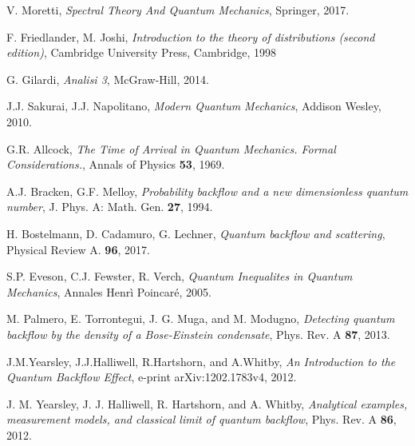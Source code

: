 \documentclass[11pt,a4paper,twoside,openany]{book}
\begin{document}
    \pagestyle{fancy}
    \fancyhf{}
    \fancyfoot[LE,RO]{\thepage}
    
    
    
    \pagestyle{fancy}
    \fancyhf{}
    \fancyfoot[LE,RO]{\thepage}
    
\begin{thebibliography}{50}
	V. Moretti, 
	\textit{Spectral Theory And Quantum Mechanics},
	Springer,
	2017.
	
	F. Friedlander, M. Joshi, 
	\textit{ Introduction to the theory of distributions (second
		edition)}, Cambridge University Press, Cambridge, 1998	
	
	G. Gilardi,
	\textit{Analisi 3},
	McGraw-Hill,
	2014.
	
	J.J. Sakurai, J.J. Napolitano,
	\textit{Modern Quantum Mechanics},
	Addison Wesley,
	2010.
	
    G.R. Allcock, 
	\textit{The Time of Arrival in Quantum Mechanics. Formal Considerations.},
	Annals of Physics \textbf{53},
	1969.
	
	A.J. Bracken, G.F. Melloy,
	\textit{Probability backflow and a new dimensionless quantum
	number},
	J. Phys. A: Math. Gen. \textbf{27},
	1994.
	
	
	H. Bostelmann, D. Cadamuro, G. Lechner,
	\textit{Quantum backflow and scattering},
	Physical Review A. \textbf{96},
	2017.
	
	S.P. Eveson, C.J. Fewster, R. Verch,
	\textit{Quantum Inequalites in Quantum Mechanics},
	Annales Henrì Poincaré,
	2005.
	
	M. Palmero, E. Torrontegui, J. G. Muga, and M. Modugno,
	\textit{Detecting quantum backflow by the density of a Bose-Einstein condensate},
	Phys. Rev. A \textbf{87},
	2013.
	
	J.M.Yearsley, J.J.Halliwell, R.Hartshorn, and A.Whitby,
	\textit{An Introduction to the Quantum Backflow Effect},
	e-print arXiv:1202.1783v4,
	2012.
	
	J. M. Yearsley, J. J. Halliwell, R. Hartshorn, and A. Whitby, 
	\textit{Analytical examples, measurement models, and classical limit of quantum backflow},
	Phys. Rev. A \textbf{86},
	2012.
	

\end{thebibliography}
\end{document}
